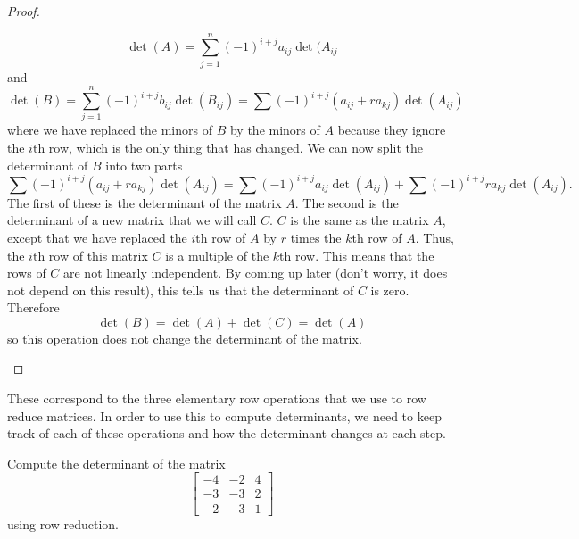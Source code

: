 \documentclass{ximera}
\begin{document}
\begin{proof}
\begin{enumerate}
        \[ 
            \det(A) = \sum_{j=1}^n (-1)^{i+j}a_{ij}\det(A_{ij} 
        \] 
        and 
        \[ 
            \det(B) = \sum_{j=1}^n (-1)^{i+j} b_{ij}\det(B_{ij}) = \sum (-1)^{i+j} (a_{ij} + ra_{kj})\det(A_{ij}) 
        \] 
        where we have replaced the minors of $B$ by the minors of $A$ because they ignore the $i$th row, which is the only thing that has changed. We can now split the determinant of $B$ into two parts
        \[ 
            \sum (-1)^{i+j} (a_{ij} + ra_{kj})\det(A_{ij}) = \sum (-1)^{i+j} a_{ij}\det(A_{ij}) + \sum (-1)^{i+j} ra_{kj}\det(A_{ij}). 
        \] 
        The first of these is the determinant of the matrix $A$. The second is the determinant of a new matrix that we will call $C$. $C$ is the same as the matrix $A$, except that we have replaced the $i$th row of $A$ by $r$ times the $k$th row of $A$. Thus, the $i$th row of this matrix $C$ is a multiple of the $k$th row. This means that the rows of $C$ are not linearly independent. By  coming up later (don't worry, it does not depend on this result), this tells us that the determinant of $C$ is zero. Therefore
        \[ 
            \det(B) = \det(A) + \det(C) = \det(A) 
        \] 
        so this operation does not change the determinant of the matrix.
    \end{enumerate}
\end{proof}

These correspond to the three elementary row operations that we use to row reduce matrices. In order to use this to compute determinants, we need to keep track of each of these operations and how the determinant changes at each step. 

\begin{example}
    Compute the determinant of the matrix
    \[ 
        \begin{bmatrix}  
            -4  & -2 & 4\\
            -3 & -3  & 2\\
            -2 &-3 & 1
        \end{bmatrix} 
    \]
    using row reduction. 
\end{example}
\end{document}
